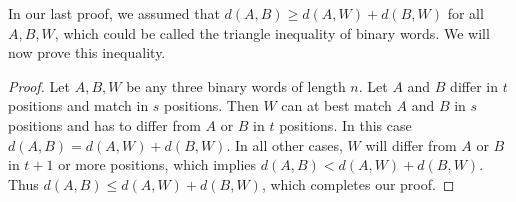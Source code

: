 \documentclass[11pt, b5paper, draft, fleqn]{book}
\theoremstyle{remark}
\theoremstyle{plain}
\begin{document}
\begin{enumerate}
	In our last proof, we assumed that \(d(A, B) \geq d(A, W) + d(B, W)\) for all \(A, B, W\), which could be called the triangle inequality of binary words. We will now prove this inequality.
	\begin{proof}
		Let \(A, B, W\) be any three binary words of length \(n\). Let \(A\) and \(B\) differ in \(t\) positions and match in \(s\) positions. Then \(W\) can at best match \(A\) and \(B\) in \(s\) positions and has to differ from \(A\) or \(B\) in \(t\) positions. In this case \(d(A, B) = d(A, W) + d(B, W)\). In all other cases, \(W\) will differ from \(A\) or \(B\) in \(t+1\) or more positions, which implies \(d(A,B) < d(A, W) + d(B, W)\). Thus \(d(A, B) \leq d(A, W) + d(B, W)\), which completes our proof.
	\end{proof}
\end{enumerate}
\end{document}
